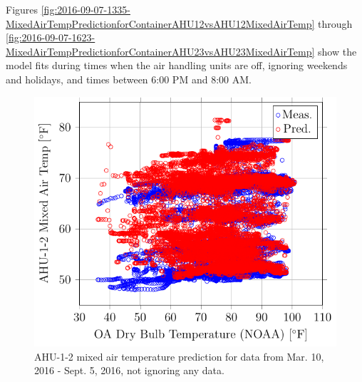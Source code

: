 Figures \ref{fig:2016-09-07-1335-MixedAirTempPredictionforContainerAHU12vsAHU12MixedAirTemp} through \ref{fig:2016-09-07-1623-MixedAirTempPredictionforContainerAHU23vsAHU23MixedAirTemp} show the model fits during times when the air handling units are off, ignoring weekends and holidays, and times between 6:00 PM and 8:00 AM.

\newcommand{\matcaption}[1]{#1 mixed air temperature prediction for data from Mar. 10, 2016 - Sept. 5, 2016, not ignoring any data.}

\begin{figure}
\centering
\includegraphics[]{Plots/2016-09-07-1218-AHU12MixedAirTempvsOADryBulbTemperatureNOAA.pdf}
\caption{\matcaption{AHU-1-2}}
\label{fig:2016-09-07-1218-AHU12MixedAirTempvsOADryBulbTemperatureNOAA}
\end{figure}

